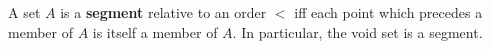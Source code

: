 A set $A$ is a \textbf{segment} relative to an order $<$ iff each point which precedes a member of $A$ is itself a member of $A$. In particular, the void set is a segment.
